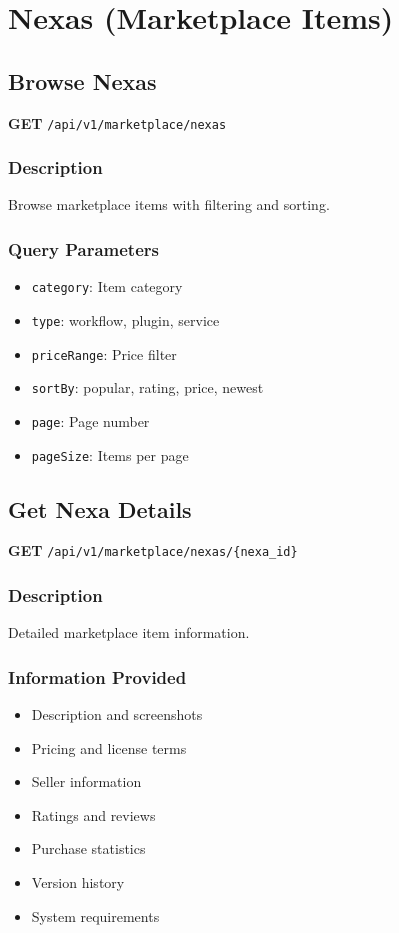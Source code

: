 \documentclass[11pt,a4paper]{report}
\begin{document}
\section{Nexas (Marketplace Items)}

\subsection{Browse Nexas}

\textbf{GET} \texttt{/api/v1/marketplace/nexas}

\subsubsection{Description}
Browse marketplace items with filtering and sorting.

\subsubsection{Query Parameters}
\begin{itemize}[leftmargin=*]
    \item \texttt{category}: Item category
    \item \texttt{type}: workflow, plugin, service
    \item \texttt{priceRange}: Price filter
    \item \texttt{sortBy}: popular, rating, price, newest
    \item \texttt{page}: Page number
    \item \texttt{pageSize}: Items per page
\end{itemize}

\subsection{Get Nexa Details}

\textbf{GET} \texttt{/api/v1/marketplace/nexas/\{nexa\_id\}}

\subsubsection{Description}
Detailed marketplace item information.

\subsubsection{Information Provided}
\begin{itemize}[leftmargin=*]
    \item Description and screenshots
    \item Pricing and license terms
    \item Seller information
    \item Ratings and reviews
    \item Purchase statistics
    \item Version history
    \item System requirements
\end{itemize}
\end{document}
